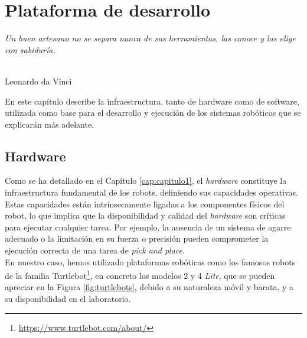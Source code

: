 \chapter{Plataforma de desarrollo}
\label{cap:capitulo3}

\begin{flushright}
\begin{minipage}[]{10cm}
\emph{Un buen artesano no se separa nunca de sus herramientas, las conoce y las elige con sabiduría.}\\
\end{minipage}\\

Leonardo da Vinci\\
\end{flushright}

\vspace{1cm}


En este capítulo describe la infraestructura, tanto de hardware como de
software, utilizada como base para el desarrollo y ejecución de los sistemas
robóticos que se explicarán más adelante.

\section{Hardware}
\label{sec:hardware}

Como se ha detallado en el Capítulo \ref{cap:capitulo1}, el \textit{hardware}
constituye la infraestructura fundamental de los robots, definiendo sus
capacidades operativas.
Estas capacidades están intrínsecamente ligadas a los componentes físicos del
robot, lo que implica que la disponibilidad y calidad del \textit{hardware} son
críticas para ejecutar cualquier tarea.
Por ejemplo, la ausencia de un sistema de agarre adecuado o la limitación en su
fuerza o precisión pueden comprometer la ejecución correcta de una tarea de
\textit{pick and place}.
\\

En nuestro caso, hemos utilizado plataformas robóticas como los famosos robots
de la familia Turtlebot\footnote{
\href{https://www.turtlebot.com/about/}{https://www.turtlebot.com/about/}}, en
concreto los modelos 2 y 4 \textit{Lite}, que se pueden apreciar en la Figura
\ref{fig:turtlebots}, debido a su naturaleza móvil y barata, y a su
disponibilidad en el laboratorio.
\\

